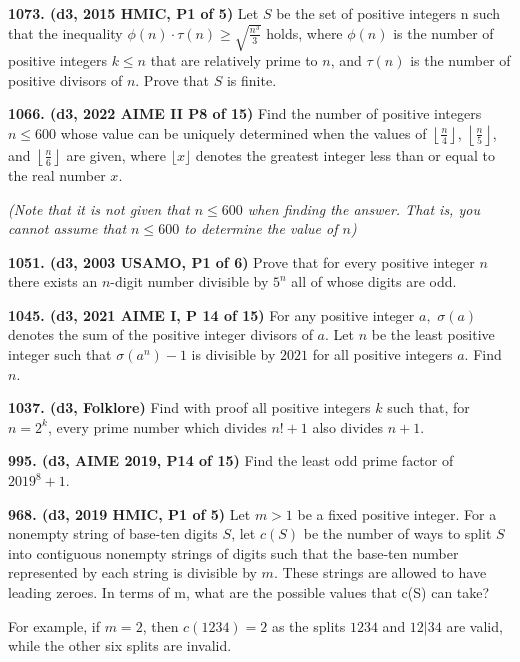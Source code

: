 \documentclass{article}
\begin{document}
\textbf{1073. (\color{red}d3\color{black}, 2015 HMIC, P1 of 5)} Let $S$ be the set of positive integers n such that the inequality
$\phi(n) · \tau(n) \geq \sqrt{\frac{n^3}{3}}$
holds, where $\phi(n)$ is the number of positive integers $k \leq n$ that are relatively prime to $n$, and $\tau (n)$ is
the number of positive divisors of $n$. Prove that $S$ is finite.

\textbf{1066. (\color{red}d3\color{black}, 2022 AIME II P8 of 15)} Find the number of positive integers $n \le 600$ whose value can be uniquely determined when the values of $\left\lfloor \frac n4\right\rfloor$, $\left\lfloor\frac n5\right\rfloor$, and $\left\lfloor\frac n6\right\rfloor$ are given, where $\lfloor x \rfloor$ denotes the greatest integer less than or equal to the real number $x$.

\begin{center}
    {\it (Note that it is not given that $n \le 600$ when finding the answer. That is, you cannot assume that $n \le 600$ to determine the value of $n$)}
\end{center}


\textbf{1051. (\color{red}d3\color{black}, 2003 USAMO, P1 of 6)} Prove that for every positive integer $n$ there exists an $n$-digit number divisible by $5^{n}$ all of whose digits are odd.

\textbf{1045. (\color{red}d3\color{black}, 2021 AIME I, P 14 of 15)} For any positive integer $a,$ $\sigma(a)$ denotes the sum of the positive integer divisors of $a$. Let $n$ be the least positive integer such that $\sigma(a^n)-1$ is divisible by $2021$ for all positive integers $a$. Find $n$.

\textbf{1037. (\color{red}d3\color{black}, Folklore)} Find with proof all positive integers $k$ such that, for $n=2^{k}$, every prime number which divides $n!+1$ also divides $n+1$.

\textbf{995. (\color{red}d3\color{black}, AIME 2019, P14 of 15)} Find the least odd prime factor of $2019^{8}+1$.

\textbf{968. (\color{red}d3\color{black}, 2019 HMIC, P1 of 5)} Let $m > 1$ be a fixed positive integer. For a nonempty string of base-ten digits $S$, let $c(S)$ be the number of ways to split $S$ into contiguous nonempty strings of digits such that the base-ten number represented by each string is divisible by $m$. These strings are allowed to have leading zeroes.
In terms of m, what are the possible values that c(S) can take?

For example, if $m = 2$, then $c(1234) = 2$ as the splits $1234$ and $12|34$ are valid, while the other six splits are invalid.
\end{document}
